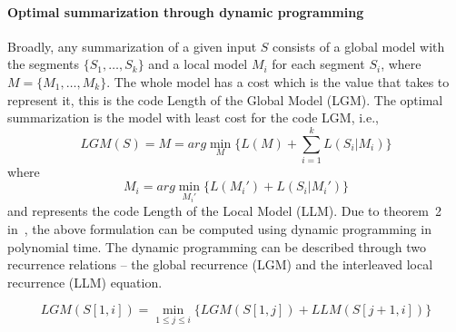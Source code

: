 \paragraph{Optimal summarization through dynamic programming}
Broadly,  any summarization of a given input $S$ consists of
a global model with the segments $\{S_1,\dots ,S_k\}$
and a local model $M_i$ for each segment $S_i$, where $M = \{M_1,\dots ,M_k\}$. The whole model has a cost which is the value that takes to represent it, this is the code Length of the Global Model (LGM).
The optimal summarization is the model with least cost for the code LGM, i.e.,
\begin{equation} LGM(S) = M = arg \mathop{min}_{M} \{L(M)+\sum_{i=1}^{k}L(S_i|M_i)\} \label{eq:lgm} \end{equation}
where
\begin{equation*}
M_i = arg \mathop{min}_{M_i'} \{L(M_i')+L(S_i|M_i')\}
\end{equation*}
and represents the code Length of the Local Model (LLM).
Due to theorem~2 in~\cite{Kiernan:constructing}, the above formulation
can be computed using dynamic programming in polynomial time. The dynamic programming can
be described through two recurrence relations --
the global recurrence (LGM) and the interleaved local recurrence (LLM) equation.

\begin{equation}
LGM(S[1,i])= \mathop{min}_{1 \leq j \leq i} \{LGM(S[1,j])+LLM(S[j+1,i])\}
\label{eq:rec}
\end{equation}



